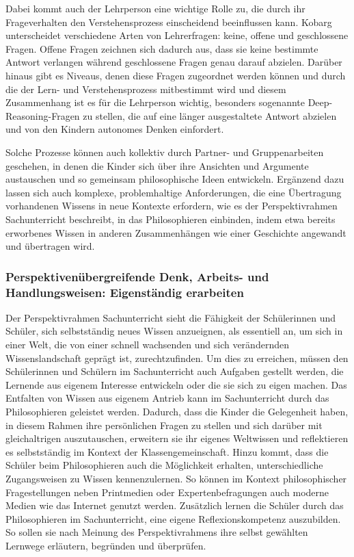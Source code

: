 Dabei kommt auch der Lehrperson eine wichtige Rolle zu, die durch ihr Frageverhalten den Verstehensprozess einscheidend beeinflussen kann. 
Kobarg unterscheidet verschiedene Arten von Lehrerfragen: keine, offene und geschlossene Fragen. 
Offene Fragen zeichnen sich dadurch aus, dass sie keine bestimmte Antwort verlangen während geschlossene Fragen genau darauf abzielen. 
Darüber hinaus gibt es Niveaus, denen diese Fragen zugeordnet werden können\cite[S.\,22]{HB15} und durch die der Lern- und Verstehensprozess mitbestimmt wird und diesem Zusammenhang ist es für die Lehrperson wichtig, besonders sogenannte \glqq Deep-Reasoning\grqq{}-Fragen zu stellen, die auf eine länger ausgestaltete Antwort abzielen und von den Kindern autonomes Denken einfordert. 

Solche Prozesse können auch kollektiv durch Partner- und Gruppenarbeiten geschehen, in denen die Kinder sich über ihre Ansichten und Argumente austauschen und so gemeinsam philosophische Ideen entwickeln. 
Ergänzend dazu lassen sich auch \glqq komplexe, problemhaltige Anforderungen, die eine Übertragung vorhandenen Wissens in neue Kontexte erfordern\grqq{}\cite[S.\,21]{GDS13}, wie es der Perspektivrahmen Sachunterricht beschreibt, in das Philosophieren einbinden, indem etwa bereits erworbenes Wissen in anderen Zusammenhängen wie einer Geschichte angewandt und übertragen wird. 

\newpage

\subsubsection{Perspektivenübergreifende Denk, Arbeits- und Handlungsweisen: Eigenständig erarbeiten}


Der Perspektivrahmen Sachunterricht sieht die Fähigkeit der Schülerinnen und Schüler, sich selbstständig neues Wissen anzueignen, als essentiell an, um sich in einer Welt, die von einer schnell wachsenden und sich verändernden Wissenslandschaft geprägt ist, zurechtzufinden. 
Um dies zu erreichen, müssen den Schülerinnen und Schülern im Sachunterricht auch Aufgaben gestellt werden, \glqq die Lernende aus eigenem Interesse entwickeln oder die sie sich zu eigen machen.\grqq{}\cite[S.\,22]{GDS13}
Das Entfalten von Wissen aus eigenem Antrieb kann im Sachunterricht durch das Philosophieren geleistet werden. 
Dadurch, dass die Kinder die Gelegenheit haben, in diesem Rahmen ihre persönlichen Fragen zu stellen und sich darüber mit gleichaltrigen auszutauschen, erweitern sie ihr eigenes Weltwissen und reflektieren es selbstständig im Kontext der Klassengemeinschaft. 
Hinzu kommt, dass die Schüler beim Philosophieren auch die Möglichkeit erhalten, unterschiedliche Zugangsweisen zu Wissen kennenzulernen. 
So können im Kontext philosophischer Fragestellungen neben Printmedien oder Expertenbefragungen auch moderne Medien wie das Internet genutzt werden.
Zusätzlich lernen die Schüler durch das Philosophieren im Sachunterricht, eine eigene Reflexionskompetenz auszubilden. 
So sollen sie nach Meinung des Perspektivrahmens \glqq ihre selbst gewählten Lernwege erläutern, begründen und überprüfen.\grqq{}\cite[S.\,23]{GDS13}


